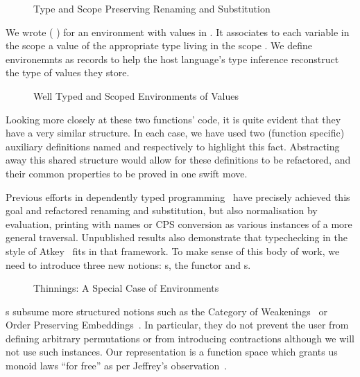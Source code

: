 \begin{figure}[h]
\begin{minipage}{0.45\textwidth}
\end{minipage}\hspace{2em}
\begin{minipage}{0.45\textwidth}
\end{minipage}
\caption{Type and Scope Preserving Renaming and Substitution}
\end{figure}

We wrote ( )   for an environment with values
in . It associates to each variable in the scope  a value of
the appropriate type living in the scope . We define environemnts
as records to help the host language's type inference reconstruct the type
of values they store.

\begin{figure}[h]
\caption{Well Typed and Scoped Environments of Values}
\end{figure}

Looking more closely at these two functions' code, it is quite evident
that they have a very similar structure. In each case, we have used
two (function specific) auxiliary definitions named  and 
respectively to highlight this fact. Abstracting away this shared structure
would allow for these definitions to be refactored, and their common
properties to be proved in one swift move.

Previous efforts in dependently typed
programming~\cite{benton2012strongly,allais2017type}
have precisely achieved this goal and refactored renaming and substitution,
but also normalisation by evaluation, printing with names or CPS conversion
as various instances of a more general traversal. Unpublished results also
demonstrate that typechecking in the style of Atkey~\citeyear{atkey2015algebraic}
fits in that framework. To make sense of this body of work, we
need to introduce three new notions: s, the  functor and
s.

\begin{figure}[h]
\caption{Thinnings: A Special Case of Environments}
\end{figure}

s subsume more structured notions such as the Category of
Weakenings~\cite{altenkirch1995categorical} or Order Preserving
Embeddings~\cite{chapman2009type}. In particular, they do not prevent the
user from defining arbitrary permutations or from introducing contractions
although we will not use such instances. Our representation is a function
space which grants us monoid laws ``for free'' as per Jeffrey's
observation~\citeyear{jeffrey2011assoc}.

